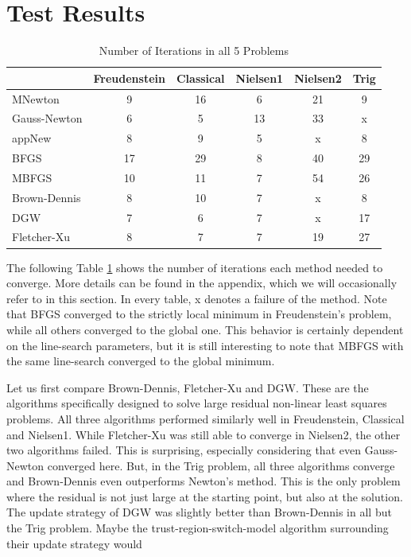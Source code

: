 \documentclass{article}
\theoremstyle{plain}%
\theoremstyle{definition}
\begin{document}
\section{Test Results}
\label{test}
\begin{table}[H]
  \centering
  \begin{tabular}{|l|c|c|c|c|c|}
    \hline
    & Freudenstein & Classical & Nielsen1 &Nielsen2 & Trig  \\ \hline
 MNewton &9&16&6&21&9 \\ \hline
Gauss-Newton &6&5&13&33&x \\ \hline
 appNew &8&9&5&x&8 \\ \hline
 BFGS &17&29&8&40&29 \\ \hline
 MBFGS &10&11&7&54&26 \\ \hline
 Brown-Dennis &8&10&7&x&8 \\ \hline
 DGW &7&6&7&x&17 \\ \hline
 Fletcher-Xu &8&7&7&19&27 \\ \hline
  \end{tabular}
  \caption{Number of Iterations in all 5 Problems}
  \label{tab:iter}
\end{table}
The following Table \ref{tab:iter} shows the number of iterations each method needed to converge.
More details can be found in the appendix, which we will occasionally refer to in this section.
In every table, x denotes a failure of the method. Note that BFGS converged to the strictly local minimum in
Freudenstein's problem, while all others converged to the global one. This behavior is certainly dependent on the line-search parameters, but it is still interesting
to note that MBFGS with the same line-search converged to the global minimum. \par
Let us first compare Brown-Dennis, Fletcher-Xu and DGW. These are the algorithms specifically designed to solve large residual non-linear least squares problems.
All three algorithms performed similarly well in Freudenstein, Classical and Nielsen1. While Fletcher-Xu was still able to converge in Nielsen2, the other two algorithms
failed. This is surprising, especially considering that even Gauss-Newton converged here. But, in the Trig problem, all three algorithms converge and Brown-Dennis even
outperforms Newton's method. This is the only problem where the residual is not just large at the starting point, but also at the solution.  The update strategy
of DGW was slightly better than Brown-Dennis in all but the Trig problem. Maybe the trust-region-switch-model algorithm surrounding their update strategy would
\end{document}
